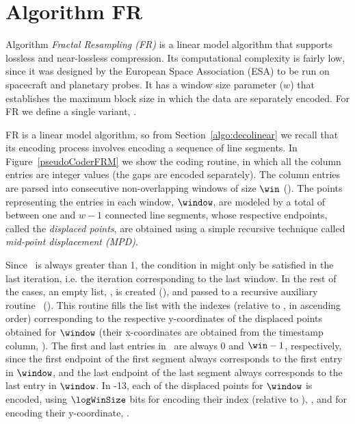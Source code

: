 
\section{Algorithm FR}
\label{algo:fr}

Algorithm \textit{Fractal Resampling (FR)} \cite{coder:fr} is a linear model algorithm that supports lossless and near-lossless compression. Its computational complexity is fairly low, since it was designed by the European Space Association (ESA) to be run on spacecraft and planetary probes. It has a window size parameter ($w$) that establishes the maximum block size in which the data are separately encoded. For FR we define a single variant, \maskalgo.

FR is a linear model algorithm, so from Section~\ref{algo:decolinear} we recall that its encoding process involves encoding a sequence of line segments. In Figure~\ref{pseudoCoderFRM} we show the coding routine, in which all the column entries are integer values (the gaps are encoded separately). The column entries are parsed into consecutive non-overlapping windows of size $\win$ (). The points representing the entries in each window, $\window$, are modeled by a total of between one and $w-1$ connected line segments, whose respective endpoints, called the \textit{displaced points}, are obtained using a simple recursive technique called \textit{mid-point displacement (MPD)}.


Since \win\ is always greater than 1, the condition in  might only be satisfied in the last iteration, i.e. the iteration corresponding to the last window. In the rest of the cases, an empty list, \disPoints, is created (), and passed to a recursive auxiliary routine \getDisplacedPointsMethod\ (). This routine fills the list with the indexes (relative to \window, in ascending order) corresponding to the respective y-coordinates of the displaced points obtained for $\window$ (their x-coordinates are obtained from the timestamp column, \tscol). The first and last entries in \disPoints\ are always 0 and $\win-1$, respectively, since the first endpoint of the first segment always corresponds to the first entry in $\window$, and the last endpoint of the last segment always corresponds to the last entry in $\window$. In -13, each of the displaced points for $\window$ is encoded, using $\logWinSize$ bits for encoding their index (relative to \window), \indexx, and \tobitexp for encoding their y-coordinate, \winIndex.


\clearpage


